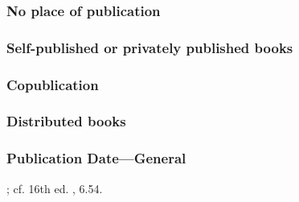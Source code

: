 \documentclass[11pt,letterpaper,oneside]{article}
\begin{document}
\setcounter{subsubsection}{131}
\subsubsection{No place of publication}

\begin{citeonly}
\item \cite{windsor1910}
\item \cite{vliet1890}
\end{citeonly}

\setcounter{subsubsection}{136}
\subsubsection{Self-published or privately published books}

\begin{citebib}
\item \cite{karavaev2015}
\item \cite{shumaker2014}
\end{citebib}

\setcounter{subsubsection}{139}
\subsubsection{Copublication}

\begin{citebib}
\item \cite{strauss1962}
\end{citebib}

\subsubsection{Distributed books}

\begin{citebib}
\item \cite{willke2007}
\end{citebib}

\subsubsection{Publication Date---General}
\label{14.142}

\begin{citebib}
\item \cite*[6.56]{chicago2017}; cf. 16th ed. \parencite*{chicago2010}, 6.54.
\item \cite{turabian2013}
\end{citebib}
\end{document}
